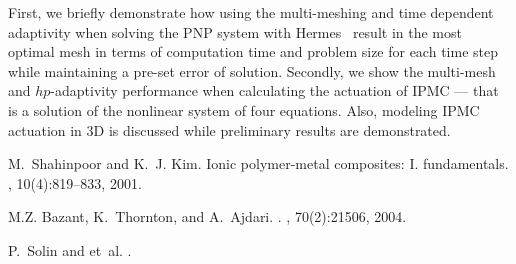 First, we briefly demonstrate how using the multi-meshing and time dependent adaptivity when solving the PNP system with Hermes~\cite{Hermes-project} result in the most optimal mesh in terms of computation time and problem size for each time step while maintaining a pre-set error of solution. Secondly, we show the multi-mesh and $hp$-adaptivity performance when calculating the actuation of IPMC --- that is a solution of the nonlinear system of four equations. Also, modeling IPMC actuation in 3D is discussed while preliminary results are demonstrated.



\begin{thebibliography}{10}

M.~Shahinpoor and K.~J. Kim.
\newblock Ionic polymer-metal composites: I. fundamentals.
, 10(4):819--833, 2001.

M.Z. Bazant, K.~Thornton, and A.~Ajdari.
.
, 70(2):21506, 2004.

P.~Solin and et~al.
.

\end{thebibliography}